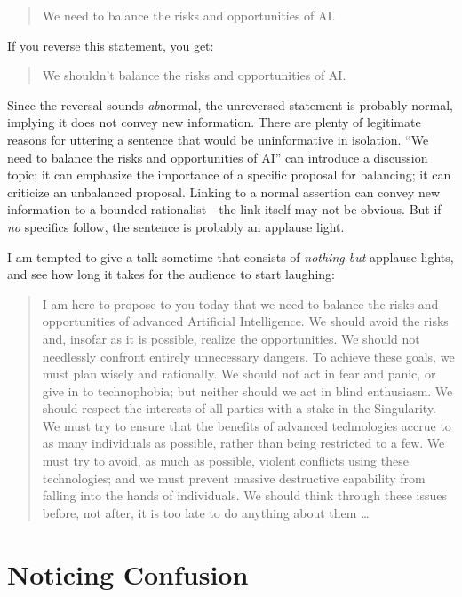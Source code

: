 \begin{quote}
{
  We need to balance the risks and opportunities of AI.}
\end{quote}

{
 If you reverse this statement, you get:}

\begin{quote}
{
 We shouldn't balance the risks and opportunities
 of AI.}
\end{quote}

{
 Since the reversal sounds \textit{ab}normal, the unreversed
statement is probably normal, implying it does not convey new
information. There are plenty of legitimate reasons for uttering a
sentence that would be uninformative in isolation.
``We need to balance the risks and opportunities of
AI'' can introduce a discussion topic; it can
emphasize the importance of a specific proposal for balancing; it can
criticize an unbalanced proposal. Linking to a normal assertion can
convey new information to a bounded rationalist---the link itself may
not be obvious. But if \textit{no} specifics follow, the sentence is
probably an applause light.}

{
 I am tempted to give a talk sometime that consists of
\textit{nothing but} applause lights, and see how long it takes for the
audience to start laughing:}

\begin{quote}
{
 I am here to propose to you today that we need to balance the
risks and opportunities of advanced Artificial Intelligence. We should
avoid the risks and, insofar as it is possible, realize the
opportunities. We should not needlessly confront entirely unnecessary
dangers. To achieve these goals, we must plan wisely and rationally. We
should not act in fear and panic, or give in to technophobia; but
neither should we act in blind enthusiasm. We should respect the
interests of all parties with a stake in the Singularity. We must try
to ensure that the benefits of advanced technologies accrue to as many
individuals as possible, rather than being restricted to a few. We must
try to avoid, as much as possible, violent conflicts using these
technologies; and we must prevent massive destructive capability from
falling into the hands of individuals. We should think through these
issues before, not after, it is too late to do anything about them
\ldots}
\end{quote}

\myendsectiontext

\chapter{Noticing Confusion}

